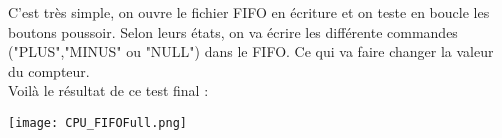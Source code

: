 C'est très simple, on ouvre le fichier FIFO en écriture et on teste en boucle les boutons poussoir. Selon leurs états, on va écrire les différente commandes ("PLUS","MINUS" ou "NULL") dans le FIFO. Ce qui va faire changer la valeur du compteur.\\
Voilà le résultat de ce test final :

\begin{center} 
\hspace{12.45cm}
\texttt{[image: CPU\_FIFOFull.png]}
\end{center}
\vspace{1cm}


 


